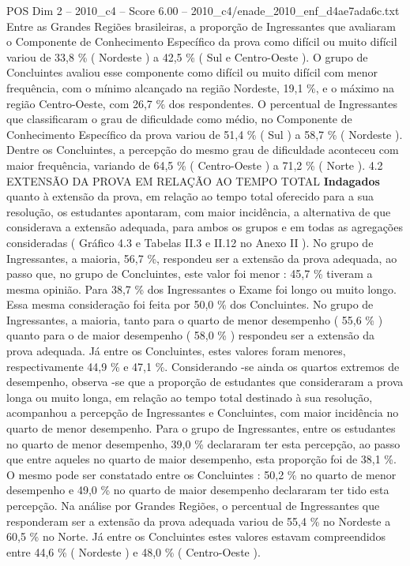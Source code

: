 \begin{textsample}{POS Dim 2 – 2010\_c4 – Score 6.00 – 2010\_c4/enade\_2010\_enf\_d4ae7ada6c.txt}
Entre as Grandes Regiões brasileiras, a proporção de Ingressantes que avaliaram o Componente de Conhecimento Específico da prova como difícil ou muito difícil variou de 33,8 \% ( Nordeste ) a 42,5 \% ( Sul e Centro-Oeste ).
O grupo de Concluintes avaliou esse componente como difícil ou muito difícil com menor frequência, com o mínimo alcançado na região Nordeste, 19,1 \%, e o máximo na região Centro-Oeste, com 26,7 \% dos respondentes.
O percentual de Ingressantes que classificaram o grau de dificuldade como médio, no Componente de Conhecimento Específico da prova variou de 51,4 \% ( Sul ) a 58,7 \% ( Nordeste ).
Dentre os Concluintes, a percepção do mesmo grau de dificuldade aconteceu com maior frequência, variando de 64,5 \% ( Centro-Oeste ) a 71,2 \% ( Norte ). 4.2 EXTENSÃO DA PROVA EM RELAÇÃO AO TEMPO TOTAL \textbf{Indagados} quanto à extensão da prova, em relação ao tempo total oferecido para a sua resolução, os estudantes apontaram, com maior incidência, a alternativa de que considerava a extensão adequada, para ambos os grupos e em todas as agregações consideradas ( Gráfico 4.3 e Tabelas II.3 e II.12 no Anexo II ).
No grupo de Ingressantes, a maioria, 56,7 \%, respondeu ser a extensão da prova adequada, ao passo que, no grupo de Concluintes, este valor foi menor : 45,7 \% tiveram a mesma opinião.
Para 38,7 \% dos Ingressantes o Exame foi longo ou muito longo.
Essa mesma consideração foi feita por 50,0 \% dos Concluintes.
No grupo de Ingressantes, a maioria, tanto para o quarto de menor desempenho ( 55,6 \% ) quanto para o de maior desempenho ( 58,0 \% ) respondeu ser a extensão da prova adequada.
Já entre os Concluintes, estes valores foram menores, respectivamente 44,9 \% e 47,1 \%.
Considerando -se ainda os quartos extremos de desempenho, observa -se que a proporção de estudantes que consideraram a prova longa ou muito longa, em relação ao tempo total destinado à sua resolução, acompanhou a percepção de Ingressantes e Concluintes, com maior incidência no quarto de menor desempenho.
Para o grupo de Ingressantes, entre os estudantes no quarto de menor desempenho, 39,0 \% declararam ter esta percepção, ao passo que entre aqueles no quarto de maior desempenho, esta proporção foi de 38,1 \%.
O mesmo pode ser constatado entre os Concluintes : 50,2 \% no quarto de menor desempenho e 49,0 \% no quarto de maior desempenho declararam ter tido esta percepção.
Na análise por Grandes Regiões, o percentual de Ingressantes que responderam ser a extensão da prova adequada variou de 55,4 \% no Nordeste a 60,5 \% no Norte.
Já entre os Concluintes estes valores estavam compreendidos entre 44,6 \% ( Nordeste ) e 48,0 \% ( Centro-Oeste ).

\end{textsample}
